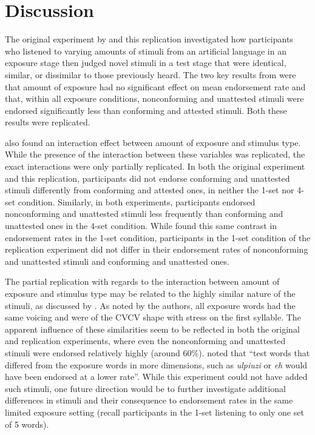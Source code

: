 \documentclass[letterpaper,11pt]{article}
\begin{document}
\section{Discussion}

The original experiment by \textcite{linzen2017rapid} and this replication investigated how participants who listened to varying amounts of stimuli from an artificial language in an exposure stage then judged novel stimuli in a test stage that were identical, similar, or dissimilar to those previously heard.
The two key results from \textcite{linzen2017rapid} were that amount of exposure had no significant effect on mean endorsement rate and that, within all exposure conditions, nonconforming and unattested stimuli were endorsed significantly less than conforming and attested stimuli.
Both these results were replicated.

\textcite{linzen2017rapid} also found an interaction effect between amount of exposure and stimulus type.
While the presence of the interaction between these variables was replicated, the exact interactions were only partially replicated.
In both the original experiment and this replication, participants did not endorse conforming and unattested stimuli differently from conforming and attested ones, in neither the 1-set nor 4-set condition.
Similarly, in both experiments, participants endorsed nonconforming and unattested stimuli less frequently than conforming and unattested ones in the 4-set condition.
While \textcite{linzen2017rapid} found this same contrast in endorsement rates in the 1-set condition, participants in the 1-set condition of the replication experiment did not differ in their endorsement rates of nonconforming and unattested stimuli and conforming and unattested ones.

The partial replication with regards to the interaction between amount of exposure and stimulus type may be related to the highly similar nature of the stimuli, as discussed by \textcite[][p. 10]{linzen2017rapid}.
As noted by the authors, all exposure words had the same voicing and were of the CVCV shape with stress on the first syllable.
The apparent influence of these similarities seem to be reflected in both the original and replication experiments, where even the nonconforming and unattested stimuli were endorsed relatively highly (around 60\%).
\textcite[][p. 10]{linzen2017rapid} noted that ``test words that differed from the exposure words in more dimensions, such as \emph{ulpiuzi} or \emph{eh} would have been endorsed at a lower rate''.
While this experiment could not have added such stimuli, one future direction would be to further investigate additional differences in stimuli and their consequence to endorsement rates in the same limited exposure setting (recall participants in the 1-set listening to only one set of 5 words).
\end{document}

